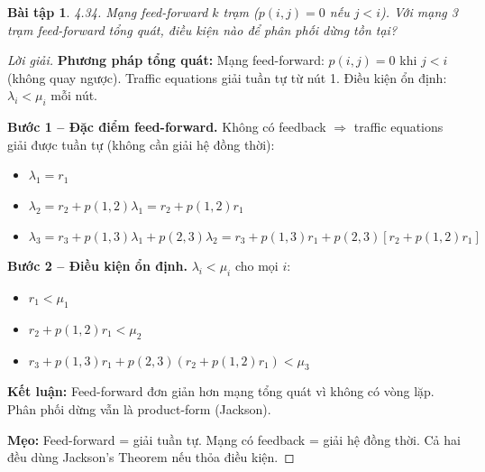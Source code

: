 \documentclass[8pt,a4paper]{article}
\newtheorem{exercise}{Bài tập}
\newenvironment{solution}{\begin{proof}[Lời giải]}{\end{proof}}
\begin{document}
\begin{exercise}
4.34. Mạng feed-forward $k$ trạm ($p(i, j) = 0$ nếu $j < i$). Với mạng 3 trạm feed-forward tổng quát, điều kiện nào để phân phối dừng tồn tại?
\end{exercise}
\begin{solution}
\textbf{Phương pháp tổng quát:} Mạng feed-forward: $p(i,j) = 0$ khi $j < i$ (không quay ngược). Traffic equations giải tuần tự từ nút 1. Điều kiện ổn định: $\lambda_i < \mu_i$ mỗi nút.

\textbf{Bước 1 -- Đặc điểm feed-forward.} Không có feedback $\Rightarrow$ traffic equations giải được tuần tự (không cần giải hệ đồng thời):
\begin{itemize}[nosep]
\item $\lambda_1 = r_1$
\item $\lambda_2 = r_2 + p(1,2)\lambda_1 = r_2 + p(1,2)r_1$
\item $\lambda_3 = r_3 + p(1,3)\lambda_1 + p(2,3)\lambda_2 = r_3 + p(1,3)r_1 + p(2,3)[r_2 + p(1,2)r_1]$
\end{itemize}

\textbf{Bước 2 -- Điều kiện ổn định.} $\lambda_i < \mu_i$ cho mọi $i$:
\begin{itemize}[nosep]
\item $r_1 < \mu_1$
\item $r_2 + p(1,2)r_1 < \mu_2$
\item $r_3 + p(1,3)r_1 + p(2,3)(r_2 + p(1,2)r_1) < \mu_3$
\end{itemize}

\textbf{Kết luận:} Feed-forward đơn giản hơn mạng tổng quát vì không có vòng lặp. Phân phối dừng vẫn là product-form (Jackson).

\textbf{Mẹo:} Feed-forward = giải tuần tự. Mạng có feedback = giải hệ đồng thời. Cả hai đều dùng Jackson's Theorem nếu thỏa điều kiện.
\end{solution}
\end{document}
